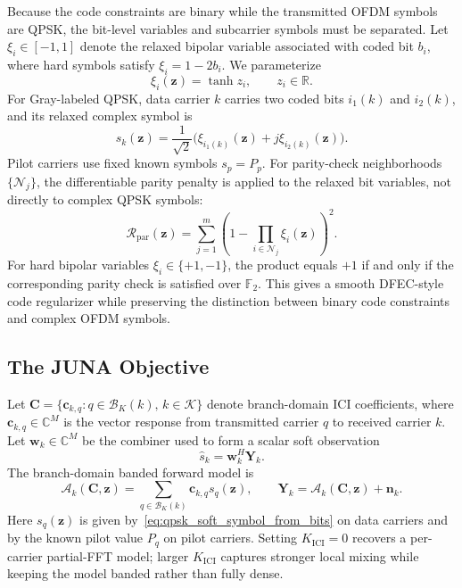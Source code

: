 \documentclass{wileysev}
\newcommand{\C}{\mathbb{C}}
\newcommand{\R}{\mathbb{R}}
\newcommand{\F}{\mathbb{F}}
\begin{document}
	Because the code constraints are binary while the transmitted OFDM symbols are QPSK, the bit-level variables and subcarrier symbols must be separated. Let \(\xi_i\in[-1,1]\) denote the relaxed bipolar variable associated with coded bit \(b_i\), where hard symbols satisfy \(\xi_i=1-2b_i\). We parameterize
	\begin{equation}
		\xi_i(\mathbf z)=\tanh z_i,
		\qquad z_i\in\R .
		\label{eq:bit_latent_tanh}
	\end{equation}
	For Gray-labeled QPSK, data carrier \(k\) carries two coded bits \(i_1(k)\) and \(i_2(k)\), and its relaxed complex symbol is
	\begin{equation}
		s_k(\mathbf z)
		=\frac{1}{\sqrt 2}
		\Big(\xi_{i_1(k)}(\mathbf z)
		+j\xi_{i_2(k)}(\mathbf z)\Big).
		\label{eq:qpsk_soft_symbol_from_bits}
	\end{equation}
	Pilot carriers use fixed known symbols \(s_p=P_p\). For parity-check neighborhoods \(\{\mathcal N_j\}\), the differentiable parity penalty is applied to the relaxed bit variables, not directly to complex QPSK symbols:
	\begin{equation}
		\mathcal R_{\mathrm{par}}(\mathbf z)
		=\sum_{j=1}^{m}
		\left(1-\prod_{i\in\mathcal N_j}\xi_i(\mathbf z)\right)^2 .
		\label{eq:bit_level_parity_penalty}
	\end{equation}
	For hard bipolar variables \(\xi_i\in\{+1,-1\}\), the product equals \(+1\) if and only if the corresponding parity check is satisfied over \(\F_2\). This gives a smooth DFEC-style code regularizer while preserving the distinction between binary code constraints and complex OFDM symbols.
	
	
	\subsection{The JUNA Objective}
	\label{ssec:juna_objective}
	
	Let \(\mathbf C=\{\mathbf c_{k,q}:q\in\mathcal B_K(k),\,k\in\mathcal K\}\) denote branch-domain ICI coefficients, where \(\mathbf c_{k,q}\in\C^M\) is the vector response from transmitted carrier \(q\) to received carrier \(k\). Let \(\mathbf w_k\in\C^M\) be the combiner used to form a scalar soft observation
	\begin{equation}
		\widehat s_k=\mathbf w_k^{H}\mathbf Y_k .
		\label{eq:combiner_soft_symbol}
	\end{equation}
	The branch-domain banded forward model is
	\begin{equation}
		\mathcal A_k(\mathbf C,\mathbf z)
		=
		\sum_{q\in\mathcal B_K(k)}\mathbf c_{k,q}s_q(\mathbf z),
		\qquad
		\mathbf Y_k = \mathcal A_k(\mathbf C,\mathbf z)+\mathbf n_k .
		\label{eq:branch_banded_model}
	\end{equation}
	Here \(s_q(\mathbf z)\) is given by~\eqref{eq:qpsk_soft_symbol_from_bits} on data carriers and by the known pilot value \(P_q\) on pilot carriers. Setting \(K_{\mathrm{ICI}}=0\) recovers a per-carrier partial-FFT model; larger \(K_{\mathrm{ICI}}\) captures stronger local mixing while keeping the model banded rather than fully dense.
	
\end{document}
